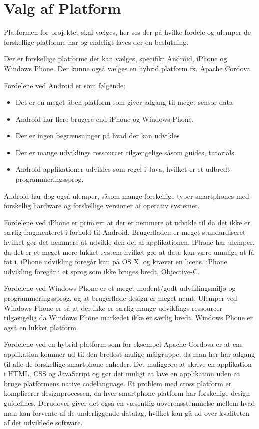 \section{Valg af Platform}\label{sec:valg_af_android}
Platformen for projektet skal vælges, her ses der på hvilke fordele og ulemper de forskellige platforme har og endeligt laves der en beslutning.

Der er forskellige platforme der kan vælges, specifikt Android, iPhone og Windows Phone.
Der kunne også vælges en hybrid platform fx. Apache Cordova \citep{misc:apachecordova}

Fordelene ved Android er som følgende:
\begin{itemize}
\item Det er en meget åben platform som giver adgang til meget sensor data
\item Android har flere brugere end iPhone og Windows Phone.
\item Der er ingen begrænsninger på hvad der kan udvikles
\item Der er mange udviklings ressourcer tilgængelige såsom guides, tutorials.
\item Android applikationer udvikles som regel i Java, hvilket er et udbredt programmeringssprog.
\end{itemize}

Android har dog også ulemper, såsom mange forskellige typer smartphones med forskellig hardware og forskellige versioner af operativ systemet.

Fordelene ved iPhone er primært at der er nemmere at udvikle til da det ikke er særlig fragmenteret i forhold til Android. 
Brugerfladen er meget standardiseret hvilket gør det nemmere at udvikle den del af applikationen. 
iPhone har ulemper, da det er et meget mere lukket system hvilket gør at data kan være umulige at få fat i. iPhone udvikling foregår kun på OS X, og kræver en licens. iPhone udvikling foregår i et sprog som ikke bruges bredt, Objective-C.

Fordelene ved Windows Phone er et meget modent/godt udviklingsmiljø og programmeringssprog, og at brugerflade design er meget nemt. 
Ulemper ved Windows Phone er så at der ikke er særlig mange udviklings ressourcer tilgængelig da Windows Phone markedet ikke er særlig bredt. Windows Phone er også en lukket platform.

Fordelene ved en hybrid platform som for eksempel Apache Cordova er at ens applikation kommer ud til den bredest mulige målgruppe, da man her har adgang til alle de forskellige smartphone enheder.
Det muliggøre at skrive en applikation i HTML, CSS og JavaScript og gør det muligt at lave en applikation uden at bruge platformens native codelanguage.
Et problem med cross platform er komplicerer designprocessen, da hver smartphone platform har forskellige design guidelines.
Derudover giver det også en væsentlig uoverensstemmelse mellem hvad man kan forvente af de underliggende datalag, hvilket kan gå ud over kvaliteten af det udviklede software.

